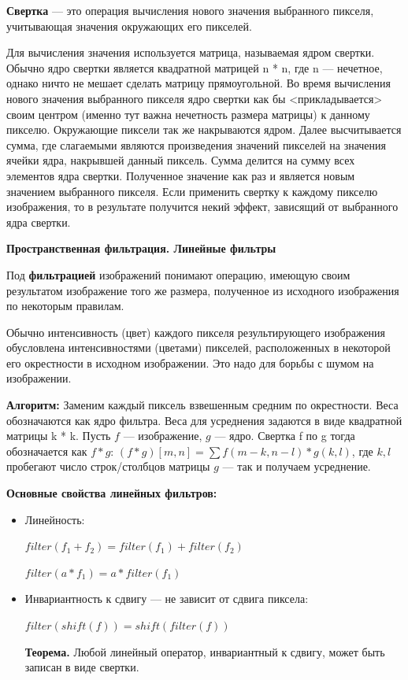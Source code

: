 \textbf{Свертка} --- это операция вычисления нового значения выбранного пикселя, учитывающая значения окружающих его пикселей.

Для вычисления значения используется матрица, называемая ядром свертки. Обычно ядро свертки является квадратной матрицей n * n, где n --- нечетное, однако ничто не мешает сделать матрицу прямоугольной.
Во время вычисления нового значения выбранного пикселя ядро свертки как бы <прикладывается> своим центром (именно тут важна нечетность размера матрицы) к данному пикселю. Окружающие пиксели так же накрываются ядром.
Далее высчитывается сумма, где слагаемыми являются произведения значений пикселей на значения ячейки ядра, накрывшей данный пиксель. Сумма делится на сумму всех элементов ядра свертки. Полученное значение как раз и является новым значением выбранного пикселя.
Если применить свертку к каждому пикселю изображения, то в результате получится некий эффект, зависящий от выбранного ядра свертки.

\textbf{Пространственная фильтрация. Линейные фильтры}

Под \textbf{фильтрацией} изображений понимают операцию, имеющую своим результатом изображение того же размера, полученное из исходного изображения по некоторым правилам.

Обычно интенсивность (цвет) каждого пикселя результирующего изображения обусловлена интенсивностями (цветами) пикселей, расположенных в некоторой его окрестности в исходном изображении. Это надо для борьбы с шумом на изображении.

\textbf{Алгоритм:} Заменим каждый пиксель взвешенным средним по окрестности. Веса обозначаются как ядро фильтра. Веса для усреднения задаются в виде квадратной матрицы k * k. \newline
Пусть $f$ --- изображение, $g$ --- ядро. Свертка f по g тогда обозначается как $f*g$: $(f * g)[m,n] = \sum f(m-k,n-l)*g(k,l)$, где $k,l$ пробегают число строк/столбцов матрицы $g$ --- так и получаем усреднение.

\textbf{Основные свойства линейных фильтров:}
\begin{itemize}
    \item Линейность: 
    
    $filter(f_1 + f_2) = filter(f_1) + filter(f_2)$
    
    $filter(a * f_1) = a * filter(f_1)$
    
    \item Инвариантность к сдвигу --- не зависит от сдвига пиксела: 
    
    $filter(shift(f)) = shift(filter(f))$
    
    \textbf{Теорема.} Любой линейный оператор, инвариантный к сдвигу, может быть записан в виде свертки.
    
\end{itemize}

